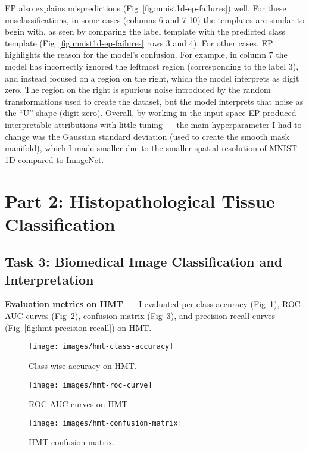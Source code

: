 \documentclass{article}
\newcommand{\myparagraph}[1]{\noindent\textbf{#1 ---}}
\begin{document}
EP also explains mispredictions (Fig~\ref{fig:mnist1d-ep-failures}) well.
For these misclassifications, in some cases (columns 6 and 7-10) the templates are similar to begin with, as seen by comparing the label template with the predicted class template (Fig~\ref{fig:mnist1d-ep-failures} rows 3 and 4).
For other cases, EP highlights the reason for the model's confusion.
For example, in column 7 the model has incorrectly ignored the leftmost region (corresponding to the label 3), and instead focused on a region on the right, which the model interprets as digit zero.
The region on the right is spurious noise introduced by the random transformations used to create the dataset, but the model interprets that noise as the ``U'' shape (digit zero).
Overall, by working in the input space EP produced interpretable attributions with little tuning --- the main hyperparameter I had to change was the Gaussian standard deviation (used to create the smooth mask manifold), which I made smaller due to the smaller spatial resolution of MNIST-1D compared to ImageNet.


\section{Part 2: Histopathological Tissue Classification}

\subsection{Task 3: Biomedical Image Classification and Interpretation}

\myparagraph{Evaluation metrics on HMT} I evaluated per-class accuracy (Fig~\ref{fig:hmt-classwise-accuracy}), ROC-AUC curves (Fig~\ref{fig:hmt-roc-curve}), confusion matrix (Fig~\ref{fig:hmt-confusion-matrix}), and precision-recall curves (Fig~\ref{fig:hmt-precision-recall}) on HMT\@.
\begin{figure}[t]
	\texttt{[image: images/hmt-class-accuracy]}
	\caption{\label{fig:hmt-classwise-accuracy}Class-wise accuracy on HMT\@.}
\end{figure}

\begin{figure}[t]
	\texttt{[image: images/hmt-roc-curve]}
	\caption{\label{fig:hmt-roc-curve}ROC-AUC curves on HMT\@.}
\end{figure}

\begin{figure}[t]
	\texttt{[image: images/hmt-confusion-matrix]}
	\caption{\label{fig:hmt-confusion-matrix}HMT confusion matrix.}
\end{figure}
\end{document}

